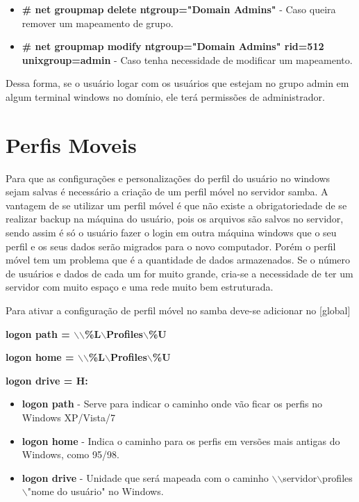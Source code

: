 \begin{itemize}
	\item \textbf{\# net groupmap delete ntgroup="Domain Admins"} - Caso queira remover um mapeamento de grupo.
	\item \textbf{\# net groupmap modify ntgroup="Domain Admins" rid=512 unixgroup=admin} - Caso tenha necessidade de modificar um mapeamento.
\end{itemize}

Dessa forma, se o usuário logar com os usuários que estejam no grupo admin em algum terminal windows no domínio, ele terá permissões de administrador.

\section{Perfis Moveis}

Para que as configurações e personalizações do perfil do usuário no windows sejam salvas é necessário a criação de um perfil móvel no servidor samba. 
A vantagem de se utilizar um perfil móvel é que não existe a obrigatoriedade de se realizar backup na máquina do usuário, pois os arquivos são salvos no servidor, sendo assim é só o usuário fazer o login em outra máquina windows que o seu perfil e os seus dados serão migrados para o novo computador. Porém o perfil móvel tem um problema que é a quantidade de dados armazenados. Se o número de usuários e dados de cada um for muito grande, cria-se a necessidade de ter um servidor com muito espaço e uma rede muito bem estruturada. 

Para ativar a configuração de perfil móvel no samba deve-se adicionar no [global] 

\textbf	{logon path = $\backslash$$\backslash$\%L$\backslash$Profiles$\backslash$\%U}

\textbf {logon home = $\backslash$$\backslash$\%L$\backslash$Profiles$\backslash$\%U}

\textbf	{logon drive = H:}

\begin{itemize}
	\item \textbf{logon path} - Serve para indicar o caminho onde vão ficar os perfis no Windows XP/Vista/7 
	\item \textbf{logon home} - Indica o caminho para os perfis em versões mais antigas do Windows, como 95/98.
	\item \textbf{logon drive} - Unidade que será mapeada com o caminho $\backslash$$\backslash$servidor$\backslash$profiles$\backslash$"nome do usuário" no Windows.
\end{itemize}

